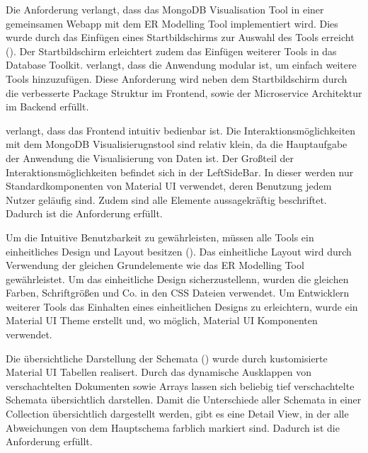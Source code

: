 \iffalse
Aufgabe des Kapitels Evaluierung ist es, in wie weit die Ziele der 
Arbeit erreicht wurden. Es sollen also die erreichten Arbeitsergebnisse 
mit den Zielen verglichen werden. Ergebnis der Evaluierung kann auch 
sein, das bestimmte Ziele nicht erreicht werden konnten, wobei die 
Ursachen hierfür auch außerhalb des Verantwortungsbereichs des 
Praktikanten liegen können.
\fi

Die Anforderung  verlangt, dass das MongoDB Visualisation Tool in einer gemeinsamen Webapp mit dem ER Modelling Tool implementiert wird.
Dies wurde durch das Einfügen eines Startbildschirms zur Auswahl des Tools erreicht ().
Der Startbildschirm erleichtert zudem das Einfügen weiterer Tools in das Database Toolkit.
 verlangt, dass die Anwendung modular ist, um einfach weitere Tools hinzuzufügen.
Diese Anforderung wird neben dem Startbildschirm durch die verbesserte Package Struktur im Frontend, sowie der Microservice Architektur im Backend erfüllt.

 verlangt, dass das Frontend intuitiv bedienbar ist.
Die Interaktionsmöglichkeiten mit dem MongoDB Visualisierugnstool sind relativ klein, da die Hauptaufgabe der Anwendung die Visualisierung von Daten ist.
Der Großteil der Interaktionsmöglichkeiten befindet sich in der LeftSideBar.
In dieser werden nur Standardkomponenten von Material UI verwendet, deren Benutzung jedem Nutzer geläufig sind.
Zudem sind alle Elemente aussagekräftig beschriftet.
Dadurch ist die Anforderung  erfüllt.

Um die Intuitive Benutzbarkeit zu gewährleisten, müssen alle Tools ein einheitliches Design und Layout besitzen ().
Das einheitliche Layout wird durch Verwendung der gleichen Grundelemente wie das ER Modelling Tool gewährleistet.
Um das einheitliche Design sicherzustellenn, wurden die gleichen Farben, Schriftgrößen und Co. in den CSS Dateien verwendet.
Um Entwicklern weiterer Tools das Einhalten eines einheitlichen Designs zu erleichtern, wurde ein Material UI Theme erstellt und, wo möglich, Material UI Komponenten verwendet.

Die übersichtliche Darstellung der Schemata () wurde durch kustomisierte Material UI Tabellen realisert.
Durch das dynamische Ausklappen von verschachtelten Dokumenten sowie Arrays lassen sich beliebig tief verschachtelte Schemata übersichtlich darstellen.
Damit die Unterschiede aller Schemata in einer Collection übersichtlich dargestellt werden, gibt es eine Detail View, in der alle Abweichungen von dem Hauptschema farblich markiert sind.
Dadurch ist die Anforderung  erfüllt.

